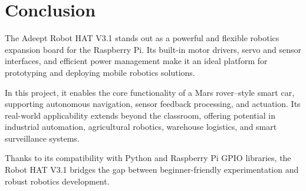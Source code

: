 \documentclass{article}
\begin{document}
	\section{Conclusion}
	The Adeept Robot HAT V3.1 stands out as a powerful and flexible robotics expansion board for the Raspberry Pi. Its built-in motor drivers, servo and sensor interfaces, and efficient power management make it an ideal platform for prototyping and deploying mobile robotics solutions.
	
	In this project, it enables the core functionality of a Mars rover–style smart car, supporting autonomous navigation, sensor feedback processing, and actuation. Its real-world applicability extends beyond the classroom, offering potential in industrial automation, agricultural robotics, warehouse logistics, and smart surveillance systems.
	
	Thanks to its compatibility with Python and Raspberry Pi GPIO libraries, the Robot HAT V3.1 bridges the gap between beginner-friendly experimentation and robust robotics development.
	
	
\end{document}

